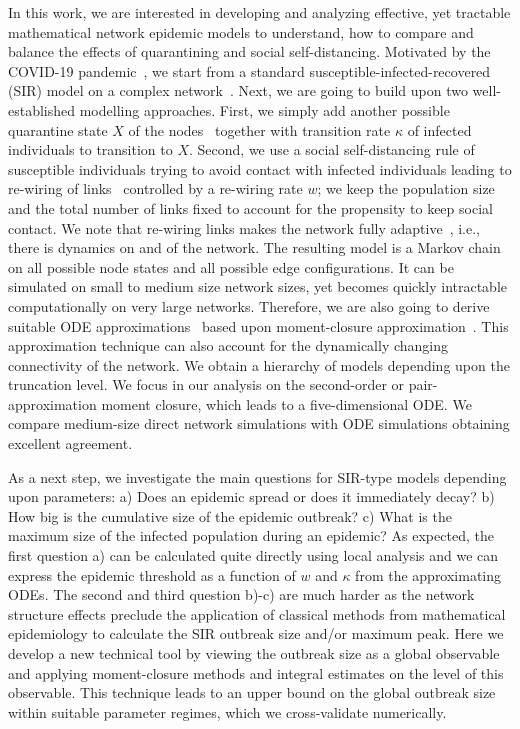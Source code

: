 \documentclass[12pt]{article}
\begin{document}
In this work, we are interested in developing and analyzing effective, yet tractable mathematical network epidemic models to understand, how to compare and balance the effects of quarantining and social self-distancing. Motivated by the COVID-19 pandemic~\cite{ThurnerKlimekHanel}, we start from a standard susceptible-infected-recovered (SIR) model on a complex network~\cite{KissMillerSimon}. Next, we are going to build upon two well-established modelling approaches. First, we simply add another possible quarantine state $X$ of the nodes~\cite{MaierBrockmann,Peaketal} together with transition rate $\kappa$ of infected individuals to transition to $X$. Second, we use a social self-distancing rule of susceptible individuals trying to avoid contact with infected individuals leading to re-wiring of links~\cite{GrossDLimaBlasius,ShawSchwartz,Risau-GusmanZanette} controlled by a re-wiring rate $w$; we keep the population size and the total number of links fixed to account for the propensity to keep social contact. We note that re-wiring links makes the network fully adaptive~\cite{GrossSayama}, i.e., there is dynamics on and of the network. The resulting model is a Markov chain on all possible node states and all possible edge configurations. It can be simulated on small to medium size network sizes, yet becomes quickly intractable computationally on very large networks. Therefore, we are also going to derive suitable ODE approximations~\cite{KissMillerSimon} based upon moment-closure approximation~\cite{Keeling,KeelingRandMorris,GrossDLimaBlasius,KuehnMC}. This approximation technique can also account for the dynamically changing connectivity of the network. We obtain a hierarchy of models depending upon the truncation level. We focus in our analysis on the second-order or pair-approximation moment closure, which leads to a five-dimensional ODE. We compare medium-size direct network simulations with ODE simulations obtaining excellent agreement. 

As a next step, we investigate the main questions for SIR-type models depending upon parameters: a) Does an epidemic spread or does it immediately decay? b) How big is the cumulative size of the epidemic outbreak? c) What is the maximum size of the infected population during an epidemic? As expected, the first question a) can be calculated quite directly using local analysis and we can express the epidemic threshold as a function of $w$ and $\kappa$ from the approximating ODEs. The second and third question b)-c) are much harder as the network structure effects preclude the application of classical methods from mathematical epidemiology to calculate the SIR outbreak size and/or maximum peak. Here we develop a new technical tool by viewing the outbreak size as a global observable and applying moment-closure methods and integral estimates on the level of this observable. This technique leads to an upper bound on the global outbreak size within suitable parameter regimes, which we cross-validate numerically. 
\end{document}
